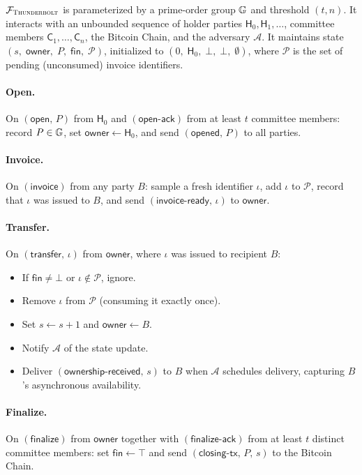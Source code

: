$\mathcal{F}_{\textsc{Thunderbolt}}$ is parameterized by a prime-order group $\mathbb{G}$ and threshold $(t,n)$.
It interacts with an unbounded sequence of holder parties $\mathsf{H}_0, \mathsf{H}_1, \ldots$,
committee members $\mathsf{C}_1,\ldots,\mathsf{C}_n$, the Bitcoin Chain, and the adversary $\mathcal{A}$.
It maintains state $(s,\; \mathsf{owner},\; P,\; \mathsf{fin},\; \mathcal{P})$,
initialized to $(0,\; \mathsf{H}_0,\; \bot,\; \bot,\; \emptyset)$,
where $\mathcal{P}$ is the set of pending (unconsumed) invoice identifiers.

\paragraph{Open.}
On $(\mathsf{open},\, P)$ from $\mathsf{H}_0$ and $(\mathsf{open\text{-}ack})$ from at least $t$
committee members:
record $P \in \mathbb{G}$, set $\mathsf{owner} \leftarrow \mathsf{H}_0$,
and send $(\mathsf{opened},\, P)$ to all parties.

\paragraph{Invoice.}
On $(\mathsf{invoice})$ from any party $B$:
sample a fresh identifier $\iota$, add $\iota$ to $\mathcal{P}$,
record that $\iota$ was issued to $B$,
and send $(\mathsf{invoice\text{-}ready},\, \iota)$ to $\mathsf{owner}$.

\paragraph{Transfer.}
On $(\mathsf{transfer},\, \iota)$ from $\mathsf{owner}$, where $\iota$ was issued to recipient $B$:
\begin{itemize}
  \item If $\mathsf{fin} \neq \bot$ or $\iota \notin \mathcal{P}$, ignore.
  \item Remove $\iota$ from $\mathcal{P}$ (consuming it exactly once).
  \item Set $s \leftarrow s+1$ and $\mathsf{owner} \leftarrow B$.
  \item Notify $\mathcal{A}$ of the state update.
  \item Deliver $(\mathsf{ownership\text{-}received},\, s)$ to $B$ when $\mathcal{A}$ schedules
        delivery, capturing $B$'s asynchronous availability.
\end{itemize}

\paragraph{Finalize.}
On $(\mathsf{finalize})$ from $\mathsf{owner}$ together with $(\mathsf{finalize\text{-}ack})$ from
at least $t$ distinct committee members:
set $\mathsf{fin} \leftarrow \top$ and send $(\mathsf{closing\text{-}tx},\, P,\, s)$ to the Bitcoin Chain.

